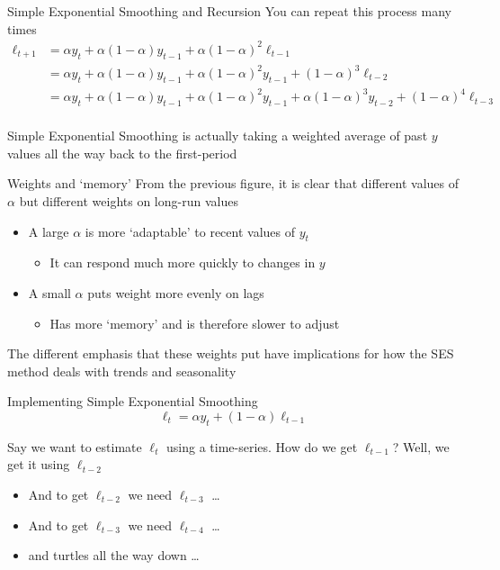 \documentclass[aspectratio=169,t,11pt,table]{beamer}
\begin{document}
\begin{frame}{Simple Exponential Smoothing and Recursion}
  You can repeat this process many times
  \begin{align*}
    \ell_{t+1} 
    &= \alpha y_t + \alpha (1 - \alpha) y_{t-1} + \alpha (1 - \alpha)^2 \ell_{t-1}  \\
    &= \alpha y_t + \alpha (1 - \alpha) y_{t-1} + \alpha (1 - \alpha)^2  y_{t-1} + (1- \alpha)^3 \ell_{t-2}  \\
    &= \alpha y_t + \alpha (1 - \alpha) y_{t-1} + \alpha (1 - \alpha)^2  y_{t-1} + \alpha (1- \alpha)^3 y_{t-2} + (1 - \alpha)^4 \ell_{t-3}  \\
  \end{align*}

  Simple Exponential Smoothing is actually taking a weighted average of past $y$ values all the way back to the first-period
\end{frame}


\begin{frame}{Weights and `memory'}
  From the previous figure, it is clear that different values of $\alpha$ but different weights on long-run values
  \begin{itemize}
    \item A large $\alpha$ is more `adaptable' to recent values of $y_t$
    \begin{itemize}
      \item It can respond much more quickly to changes in $y$
    \end{itemize}
    
    \item A small $\alpha$ puts weight more evenly on lags
    \begin{itemize}
      \item Has more `memory' and is therefore slower to adjust
    \end{itemize}
  \end{itemize}

  \bigskip
  The different emphasis that these weights put have implications for how the SES method deals with trends and seasonality
\end{frame}

\begin{frame}{Implementing Simple Exponential Smoothing}
  \vspace*{-\bigskipamount}
  $$
    \ell_{t} = \alpha y_t + (1 - \alpha) \ell_{t-1}
  $$
  
  \bigskip
  Say we want to estimate $\ell_t$ using a time-series. How do we get $\ell_{t-1}$? Well, we get it using $\ell_{t-2}$
  \begin{itemize}
    \item And to get $\ell_{t-2}$ we need $\ell_{t-3}$ \dots
    \item And to get $\ell_{t-3}$ we need $\ell_{t-4}$ \dots
    \item and turtles all the way down \dots
  \end{itemize}
\end{frame}
\end{document}
